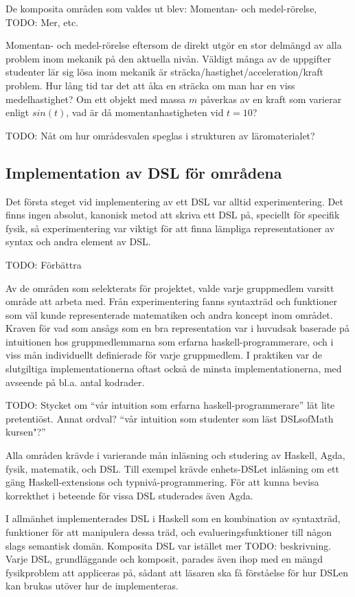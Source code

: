 \begin{binge}
  De komposita områden som valdes ut blev: Momentan- och
  medel-rörelse, TODO: Mer, etc.

  Momentan- och medel-rörelse eftersom de direkt utgör en stor delmängd
  av alla problem inom mekanik på den aktuella nivån. Väldigt många av
  de uppgifter studenter lär sig lösa inom mekanik är
  sträcka/hastighet/acceleration/kraft problem. Hur lång tid tar det att åka en
  sträcka om man har en viss medelhastighet? Om ett objekt med massa $m$
  påverkas av en kraft som varierar enligt $sin(t)$, vad är då
  momentanhastigheten vid $t=10$?


TODO: Nåt om hur områdesvalen speglas i strukturen av läromaterialet?


  \subsection{Implementation av DSL för områdena}


    Det första steget vid implementering av ett DSL var alltid
    experimentering. Det finns ingen absolut, kanonisk metod att skriva
    ett DSL på, speciellt för specifik fysik, så experimentering var
    viktigt för att finna lämpliga representationer av syntax och andra
    element av DSL.


  TODO: Förbättra

    Av de områden som selekterats för projektet, valde varje gruppmedlem
    varsitt område att arbeta med. Från experimentering fanns syntaxträd
    och funktioner som väl kunde representerade matematiken och andra
    koncept inom området. Kraven för vad som ansågs som en bra
    representation var i huvudsak baserade på intuitionen hos
    gruppmedlemmarna som erfarna haskell-programmerare, och i viss mån
    individuellt definierade för varje gruppmedlem. I praktiken var de
    slutgiltiga implementationerna oftast också de minsta
    implementationerna, med avseende på bl.a. antal kodrader.

    TODO: Stycket om ``vår intuition som erfarna haskell-programmerare''
    lät lite pretentiöst. Annat ordval? ``vår intuition som studenter
    som läst DSLsofMath kursen"?''

    Alla områden krävde i varierande mån inläsning och studering av
    Haskell, Agda, fysik, matematik, och DSL. Till exempel krävde
    enhets-DSLet inläsning om ett gäng Haskell-extensions och
    typnivå-programmering. För att kunna bevisa korrekthet i beteende
    för vissa DSL studerades även Agda.

    I allmänhet implementerades DSL i Haskell som en kombination av
    syntaxträd, funktioner för att manipulera dessa träd, och
    evalueringsfunktioner till någon slags semantisk domän. Komposita
    DSL var istället mer TODO: beskrivning. Varje DSL, grundläggande och
    komposit, parades även ihop med en mängd fysikproblem att appliceras
    på, sådant att läsaren ska få förståelse för hur DSLen kan brukas
    utöver hur de implementeras.


\end{binge}
